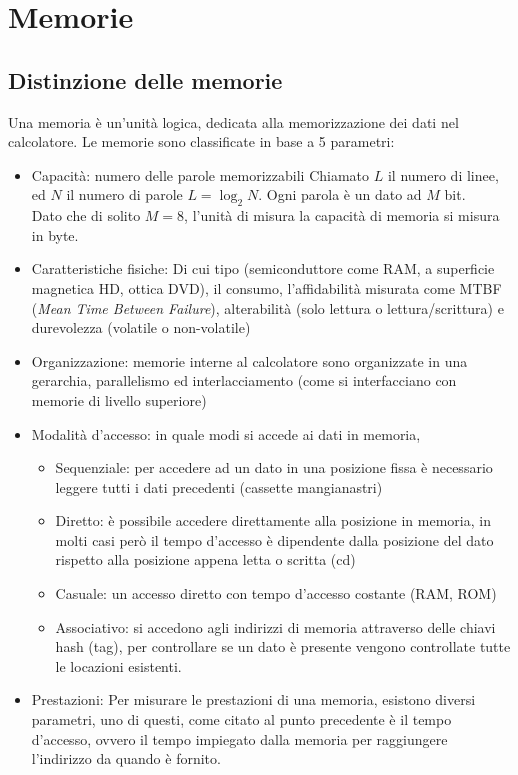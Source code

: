 \documentclass[../template]{subfiles}
\begin{document}
\section{Memorie}
\subsection{Distinzione delle memorie}
Una memoria è un'unità logica, dedicata alla memorizzazione dei dati nel calcolatore.
Le memorie sono classificate in base a 5 parametri:
\begin{itemize}
    \item Capacità: numero delle parole memorizzabili
        Chiamato $L$ il numero di linee, ed $N$ il numero di parole $L =\log_2 N$.
        Ogni parola è un dato ad $M$ bit.
        \\
        Dato che di solito $M = 8$, l'unità di misura la capacità di memoria si misura in byte.
    \item Caratteristiche fisiche:
        Di cui tipo (semiconduttore come RAM, a superficie magnetica HD, ottica DVD), il consumo,
        l'affidabilità misurata come MTBF (\textit{Mean Time Between Failure}), alterabilità (solo lettura o lettura/scrittura) e durevolezza (volatile o non-volatile)
    \item Organizzazione:
        memorie interne al calcolatore sono organizzate in una gerarchia,
        parallelismo ed interlacciamento (come si interfacciano con memorie di livello superiore)
    \item Modalità d'accesso: in quale modi si accede ai dati in memoria,
        \begin{itemize}
            \item Sequenziale: per accedere ad un dato in una posizione fissa è necessario leggere tutti i dati precedenti (cassette mangianastri)
            \item Diretto: è possibile accedere direttamente alla posizione in memoria, in molti casi però il tempo d'accesso è dipendente dalla posizione del dato rispetto alla posizione appena letta o scritta (cd)
            \item Casuale: un accesso diretto con tempo d'accesso costante (RAM, ROM)
            \item Associativo: si accedono agli indirizzi di memoria attraverso delle chiavi hash (tag), per controllare se un dato è presente vengono controllate tutte le locazioni esistenti.
        \end{itemize}

    \item Prestazioni:
        Per misurare le prestazioni di una memoria, esistono diversi parametri, uno di questi, come citato al punto precedente è il tempo d'accesso,  ovvero il tempo impiegato dalla memoria per raggiungere l'indirizzo da quando è fornito.


\end{itemize}
\end{document}
